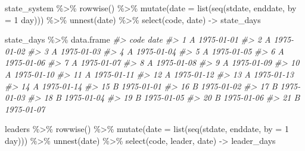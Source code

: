 \documentclass[
  11pt,
]{article}
\newenvironment{Shaded}{\begin{snugshade}}{\end{snugshade}}
\newcommand{\AttributeTok}[1]{\textcolor[rgb]{0.77,0.63,0.00}{#1}}
\newcommand{\CommentTok}[1]{\textcolor[rgb]{0.56,0.35,0.01}{\textit{#1}}}
\newcommand{\FunctionTok}[1]{\textcolor[rgb]{0.00,0.00,0.00}{#1}}
\newcommand{\NormalTok}[1]{#1}
\newcommand{\OtherTok}[1]{\textcolor[rgb]{0.56,0.35,0.01}{#1}}
\newcommand{\SpecialCharTok}[1]{\textcolor[rgb]{0.00,0.00,0.00}{#1}}
\newcommand{\StringTok}[1]{\textcolor[rgb]{0.31,0.60,0.02}{#1}}
\begin{document}
\begin{Shaded}
\begin{Highlighting}[]
\NormalTok{state\_system }\SpecialCharTok{\%\textgreater{}\%}
  \FunctionTok{rowwise}\NormalTok{() }\SpecialCharTok{\%\textgreater{}\%}
  \FunctionTok{mutate}\NormalTok{(}\AttributeTok{date =} \FunctionTok{list}\NormalTok{(}\FunctionTok{seq}\NormalTok{(stdate, enddate, }\AttributeTok{by =} \StringTok{\textquotesingle{}1 day\textquotesingle{}}\NormalTok{))) }\SpecialCharTok{\%\textgreater{}\%}
  \FunctionTok{unnest}\NormalTok{(date) }\SpecialCharTok{\%\textgreater{}\%}
  \FunctionTok{select}\NormalTok{(code, date) }\OtherTok{{-}\textgreater{}}\NormalTok{ state\_days}

\NormalTok{state\_days }\SpecialCharTok{\%\textgreater{}\%}\NormalTok{ data.frame}
\CommentTok{\#\textgreater{}    code       date}
\CommentTok{\#\textgreater{} 1     A 1975{-}01{-}01}
\CommentTok{\#\textgreater{} 2     A 1975{-}01{-}02}
\CommentTok{\#\textgreater{} 3     A 1975{-}01{-}03}
\CommentTok{\#\textgreater{} 4     A 1975{-}01{-}04}
\CommentTok{\#\textgreater{} 5     A 1975{-}01{-}05}
\CommentTok{\#\textgreater{} 6     A 1975{-}01{-}06}
\CommentTok{\#\textgreater{} 7     A 1975{-}01{-}07}
\CommentTok{\#\textgreater{} 8     A 1975{-}01{-}08}
\CommentTok{\#\textgreater{} 9     A 1975{-}01{-}09}
\CommentTok{\#\textgreater{} 10    A 1975{-}01{-}10}
\CommentTok{\#\textgreater{} 11    A 1975{-}01{-}11}
\CommentTok{\#\textgreater{} 12    A 1975{-}01{-}12}
\CommentTok{\#\textgreater{} 13    A 1975{-}01{-}13}
\CommentTok{\#\textgreater{} 14    A 1975{-}01{-}14}
\CommentTok{\#\textgreater{} 15    B 1975{-}01{-}01}
\CommentTok{\#\textgreater{} 16    B 1975{-}01{-}02}
\CommentTok{\#\textgreater{} 17    B 1975{-}01{-}03}
\CommentTok{\#\textgreater{} 18    B 1975{-}01{-}04}
\CommentTok{\#\textgreater{} 19    B 1975{-}01{-}05}
\CommentTok{\#\textgreater{} 20    B 1975{-}01{-}06}
\CommentTok{\#\textgreater{} 21    B 1975{-}01{-}07}

\NormalTok{leaders }\SpecialCharTok{\%\textgreater{}\%}
  \FunctionTok{rowwise}\NormalTok{() }\SpecialCharTok{\%\textgreater{}\%}
  \FunctionTok{mutate}\NormalTok{(}\AttributeTok{date =} \FunctionTok{list}\NormalTok{(}\FunctionTok{seq}\NormalTok{(stdate, enddate, }\AttributeTok{by =} \StringTok{\textquotesingle{}1 day\textquotesingle{}}\NormalTok{))) }\SpecialCharTok{\%\textgreater{}\%}
  \FunctionTok{unnest}\NormalTok{(date) }\SpecialCharTok{\%\textgreater{}\%}
  \FunctionTok{select}\NormalTok{(code, leader, date) }\OtherTok{{-}\textgreater{}}\NormalTok{ leader\_days}


\end{Highlighting}
\end{Shaded}
\end{document}
